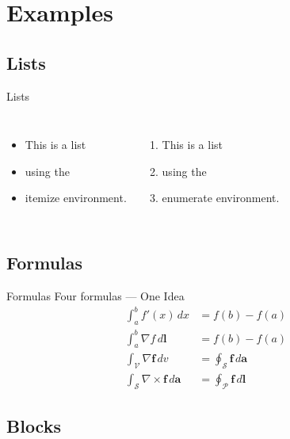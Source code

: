 \documentclass[fleqn,compress,utf8,aspectratio=169,t]{beamer}
\begin{document}

\section{Examples}

\subsection{Lists}

\begin{frame}{Lists}
  \begin{columns}[t]
    \begin{itemize}
      \item This is a list
      \item using the
      \item itemize environment.
    \end{itemize}
    \begin{enumerate}
      \item This is a list
      \item using the
      \item enumerate environment.
    \end{enumerate}
  \end{columns}
\end{frame}

\subsection{Formulas}

\begin{frame}{Formulas}
  Four formulas --- One Idea
  \begin{align}
    \int^{b}_{a} f'(x) \, dx                                 & = f(b) - f(a) \\
    \int^b_{a} \nabla f\,d\mathbf{l}                         & = f(b) - f(a) \\
    \int_{\mathcal{V}} \nabla\mathbf{f} \, dv                & =
    \oint_{\mathcal{S}} \mathbf{f} \, d\mathbf{a}                            \\
    \int_{\mathcal{S}} \nabla\times\mathbf{f} \, d\mathbf{a} & =
    \oint_{\mathcal{P}} \mathbf{f} \, d\mathbf{l}
  \end{align}
\end{frame}

\subsection{Blocks}
\end{document}
